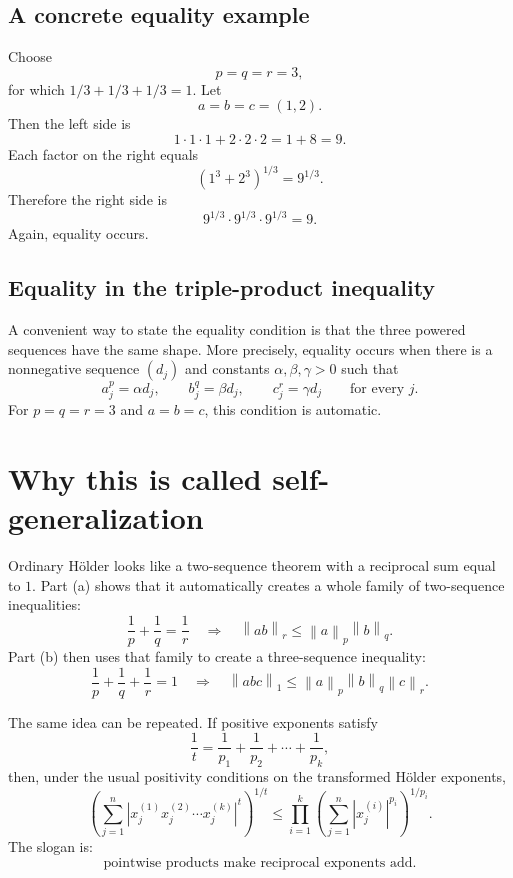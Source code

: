 \documentclass[11pt]{article}
\newcommand{\abs}[1]{\left|#1\right|}
\newcommand{\norm}[1]{\left\lVert #1\right\rVert}
\begin{document}
\subsection{A concrete equality example}

Choose
\[
  p=q=r=3,
\]
for which \(1/3+1/3+1/3=1\). Let
\[
  a=b=c=(1,2).
\]
Then the left side is
\[
  1\cdot1\cdot1+2\cdot2\cdot2=1+8=9.
\]
Each factor on the right equals
\[
  (1^3+2^3)^{1/3}=9^{1/3}.
\]
Therefore the right side is
\[
  9^{1/3}\cdot9^{1/3}\cdot9^{1/3}=9.
\]
Again, equality occurs.

\subsection{Equality in the triple-product inequality}

A convenient way to state the equality condition is that the three powered sequences have the same shape. More precisely, equality occurs when there is a nonnegative sequence \((d_j)\) and constants \(\alpha,\beta,\gamma>0\) such that
\[
  a_j^p=\alpha d_j,
  \qquad
  b_j^q=\beta d_j,
  \qquad
  c_j^r=\gamma d_j
  \qquad\text{for every }j.
  \tag{26}
\]
For \(p=q=r=3\) and \(a=b=c\), this condition is automatic.

\section{Why this is called self-generalization}

Ordinary H\"older looks like a two-sequence theorem with a reciprocal sum equal to \(1\). Part (a) shows that it automatically creates a whole family of two-sequence inequalities:
\[
  \frac1p+\frac1q=\frac1r
  \quad\Longrightarrow\quad
  \norm{ab}_r\leq\norm{a}_p\norm{b}_q.
  \tag{27}
\]
Part (b) then uses that family to create a three-sequence inequality:
\[
  \frac1p+\frac1q+\frac1r=1
  \quad\Longrightarrow\quad
  \norm{abc}_1\leq\norm{a}_p\norm{b}_q\norm{c}_r.
  \tag{28}
\]

\begin{extraBox}
The same idea can be repeated. If positive exponents satisfy
\[
  \frac1t=\frac1{p_1}+\frac1{p_2}+\cdots+\frac1{p_k},
\]
then, under the usual positivity conditions on the transformed H\"older exponents,
\[
 \left(
   \sum_{j=1}^{n}
   \abs{x_j^{(1)}x_j^{(2)}\cdots x_j^{(k)}}^t
 \right)^{1/t}
 \leq
 \prod_{i=1}^{k}
 \left(
   \sum_{j=1}^{n}\abs{x_j^{(i)}}^{p_i}
 \right)^{1/p_i}.
 \tag{29}
\]
The slogan is:
\[
 \boxed{\text{pointwise products make reciprocal exponents add.}}
\]
\end{extraBox}
\end{document}
